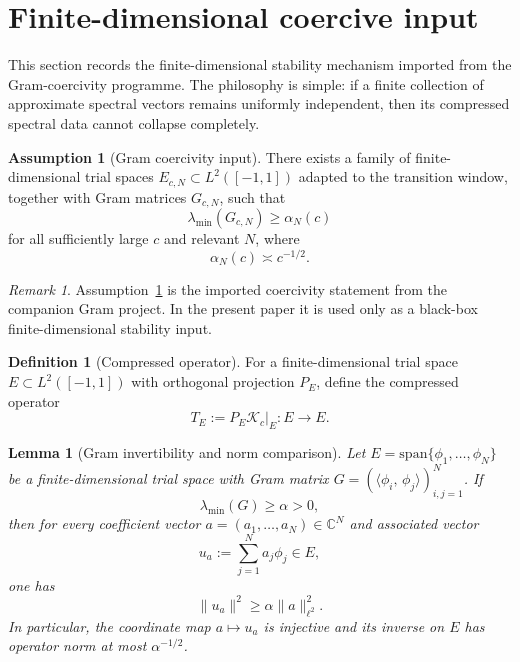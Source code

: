 \documentclass[12pt,a4paper]{amsart}
\newtheorem{lemma}[theorem]{Lemma}
\theoremstyle{definition}
\newtheorem{definition}[theorem]{Definition}
\newtheorem{assumption}[theorem]{Assumption}
\theoremstyle{remark}
\newtheorem{remark}[theorem]{Remark}
\newcommand{\ip}[2]{\langle #1,\, #2\rangle}
\newcommand{\Kc}{\mathcal{K}_c}
\newcommand{\spann}{\mathrm{span}}
\begin{document}
\section{Finite-dimensional coercive input}
\label{sec:coercive}

This section records the finite-dimensional stability mechanism imported
from the Gram-coercivity programme.
The philosophy is simple: if a finite collection of approximate spectral
vectors remains uniformly independent, then its compressed spectral data
cannot collapse completely.

\begin{assumption}[Gram coercivity input]
\label{ass:gram}
There exists a family of finite-dimensional trial spaces
$E_{c,N}\subset L^2([-1,1])$ adapted to the transition window, together with
Gram matrices $G_{c,N}$, such that
\begin{equation}\label{eq:gram-coerc}
  \lambda_{\min}(G_{c,N}) \ge \alpha_N(c)
\end{equation}
for all sufficiently large $c$ and relevant $N$, where
\begin{equation}\label{eq:alpha-scale}
  \alpha_N(c) \asymp c^{-1/2}.
\end{equation}
\end{assumption}

\begin{remark}
Assumption~\ref{ass:gram} is the imported coercivity statement from the
companion Gram project.
In the present paper it is used only as a black-box finite-dimensional
stability input.
\end{remark}

\begin{definition}[Compressed operator]
For a finite-dimensional trial space $E\subset L^2([-1,1])$ with orthogonal
projection $P_E$, define the compressed operator
\[
  T_E := P_E \Kc|_E : E \to E.
\]
\end{definition}

\begin{lemma}[Gram invertibility and norm comparison]
\label{lem:gram-norm}
Let $E=\spann\{\phi_1,\dots,\phi_N\}$ be a finite-dimensional trial space
with Gram matrix $G=(\ip{\phi_i}{\phi_j})_{i,j=1}^N$.
If
\[
  \lambda_{\min}(G)\ge \alpha>0,
\]
then for every coefficient vector $a=(a_1,\dots,a_N)\in\mathbb{C}^N$ and
associated vector
\[
  u_a := \sum_{j=1}^N a_j\phi_j \in E,
\]
one has
\begin{equation}\label{eq:gram-norm-comparison}
  \|u_a\|^2 \ge \alpha \|a\|_{\ell^2}^2.
\end{equation}
In particular, the coordinate map $a\mapsto u_a$ is injective and its inverse
on $E$ has operator norm at most $\alpha^{-1/2}$.
\end{lemma}
\end{document}
